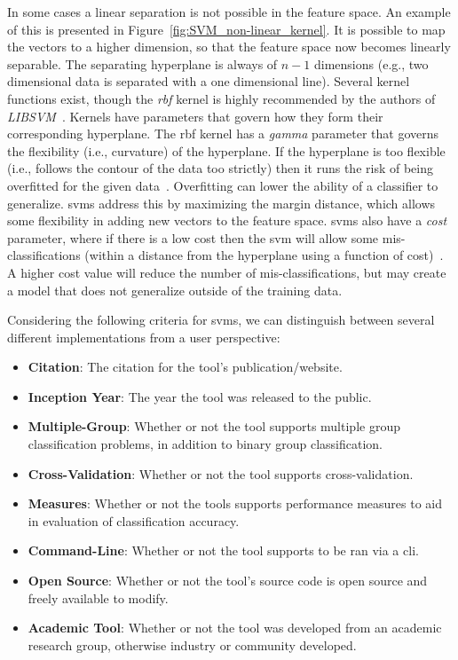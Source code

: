 In some cases a linear separation is not possible in the feature space. An example of this is presented in Figure~\ref{fig:SVM_non-linear_kernel}. It is possible to map the vectors to a higher dimension, so that the feature space now becomes linearly separable. The separating hyperplane is always of $n-1$ dimensions (e.g., two dimensional data is separated with a one dimensional line). Several kernel functions exist, though the \emph{\gls{rbf}} kernel is highly recommended by the authors of \emph{LIBSVM}~\cite{HCL03}. Kernels have parameters that govern how they form their corresponding hyperplane. The \gls{rbf} kernel has a \emph{gamma} parameter that governs the flexibility (i.e., curvature) of the hyperplane. If the hyperplane is too flexible (i.e., follows the contour of the data too strictly) then it runs the risk of being overfitted for the given data~\cite{BW10}. Overfitting can lower the ability of a classifier to generalize. \gls{svm}s address this by maximizing  the margin distance, which allows some flexibility in adding new vectors to the feature space. \gls{svm}s also have a \emph{cost} parameter, where if there is a low cost then the \gls{svm} will allow some mis-classifications (within a distance from the hyperplane using a function of cost)~\cite{BW10}. A higher cost value will reduce the number of mis-classifications, but may create a model that does not generalize outside of the training data.

Considering the following criteria for \gls{svm}s, we can distinguish between several different implementations from a user perspective:

\begin{itemize}
  \item \textbf{Citation}: The citation for the tool's publication/website.
  \item \textbf{Inception Year}: The year the tool was released to the public.
  \item \textbf{Multiple-Group}: Whether or not the tool supports multiple group classification problems, in addition to binary group classification.
  \item \textbf{Cross-Validation}: Whether or not the tool supports cross-validation.
  \item \textbf{Measures}: Whether or not the tools supports performance measures to aid in evaluation of classification accuracy.
  \item \textbf{Command-Line}: Whether or not the tool supports to be ran via a \gls{cli}.
  \item \textbf{Open Source}: Whether or not the tool's source code is open source and freely available to modify.
  \item \textbf{Academic Tool}: Whether or not the tool was developed from an academic research group, otherwise industry or community developed.
\end{itemize}

